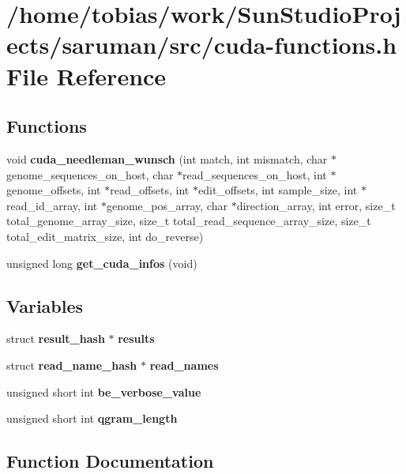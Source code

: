 \section{/home/tobias/work/SunStudioProjects/saruman/src/cuda-functions.h File Reference}
\label{cuda-functions_8h}
\subsection*{Functions}
\begin{CompactItemize}
\item 
void {\bf cuda\_\-needleman\_\-wunsch} (int match, int mismatch, char $\ast$genome\_\-sequences\_\-on\_\-host, char $\ast$read\_\-sequences\_\-on\_\-host, int $\ast$genome\_\-offsets, int $\ast$read\_\-offsets, int $\ast$edit\_\-offsets, int sample\_\-size, int $\ast$read\_\-id\_\-array, int $\ast$genome\_\-pos\_\-array, char $\ast$direction\_\-array, int error, size\_\-t total\_\-genome\_\-array\_\-size, size\_\-t total\_\-read\_\-sequence\_\-array\_\-size, size\_\-t total\_\-edit\_\-matrix\_\-size, int do\_\-reverse)
\item 
unsigned long {\bf get\_\-cuda\_\-infos} (void)
\end{CompactItemize}
\subsection*{Variables}
\begin{CompactItemize}
\item 
struct {\bf result\_\-hash} $\ast$ {\bf results}
\item 
struct {\bf read\_\-name\_\-hash} $\ast$ {\bf read\_\-names}
\item 
unsigned short int {\bf be\_\-verbose\_\-value}
\item 
unsigned short int {\bf qgram\_\-length}
\end{CompactItemize}


\subsection{Function Documentation}
